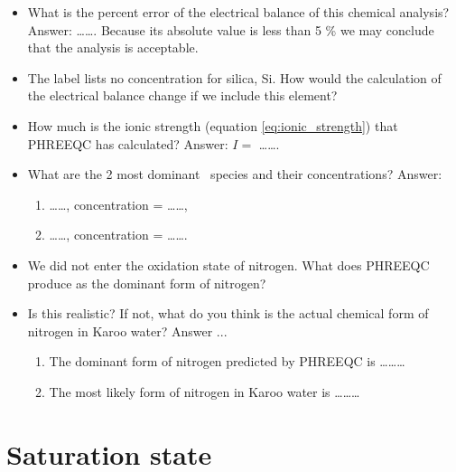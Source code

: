 \begin{itemize}

\item What is the percent error of the electrical balance of this chemical analysis? Answer: \ldots\ldots. Because its absolute value is less than 5 \% we may conclude that the analysis is acceptable.

\item The label lists no concentration for silica, Si. How would the calculation of the electrical balance change if we include this element?

\item How much is the ionic strength (equation \ref{eq:ionic_strength}) that PHREEQC has calculated? Answer: $I =$ \ldots\ldots.

\item What are the 2 most dominant \ca\ species and their concentrations? Answer: 

\begin{enumerate}
\item \ldots\ldots, concentration = \ldots\ldots, 

\item \ldots\ldots, concentration = \ldots\ldots.
\end{enumerate}


\item We did not enter the oxidation state of nitrogen. What does PHREEQC produce as the dominant form of nitrogen?  

\item Is this realistic? If not, what do you think is the actual chemical form of nitrogen in Karoo water? Answer ...


\begin{enumerate}
\item The dominant form of nitrogen predicted by PHREEQC is \ldots\ldots\ldots 

\item The most likely form of nitrogen in Karoo water is \ldots\ldots\ldots

\end{enumerate}

\end{itemize}


\newpage

\section{Saturation state}

